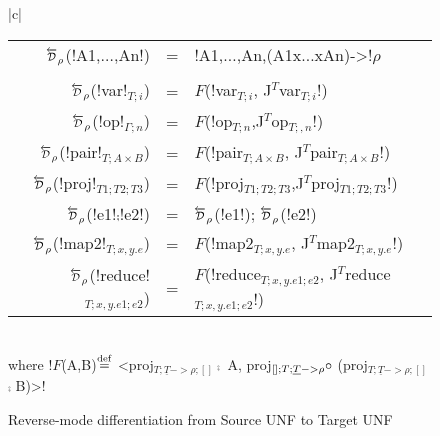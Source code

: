 \begin{figure*}[t]
\begin{tabular}{|c|}
\hline
    \begin{tabular}{r c l}
    $\Dsynrevsymbol_{\rho}$(!A1,$\ldots$,An!) &=& !A1,$\ldots$,An,(A1x$\ldots$xAn)->!$\rho$\\ \\
    $\Dsynrevsymbol_{\rho}$(!var!$_{T;i}$) &=& $F$(!var$_{T;i}$, J$^T$var$_{T;i}$!) \\
    $\Dsynrevsymbol_{\rho}$(!op!$_{\Gamma;n}$) &=& $F$(!op$_{T;n}$,J$^T$op$_{T;,n}$!) \\ 
    $\Dsynrevsymbol_{\rho}$(!pair!$_{T;A\times B}$) &=& $F$(!pair$_{T;A\times B}$, J$^T$pair$_{T;A\times B}$!) \\
    $\Dsynrevsymbol_{\rho}$(!proj!$_{T1;T2;T3}$) &=& $F$(!proj$_{T1;T2;T3}$,J$^T$proj$_{T1;T2;T3}$!) \\
    $\Dsynrevsymbol_{\rho}$(!e1!$\comp$!e2!) &=& $\Dsynrevsymbol_{\rho}$(!e1!); $\Dsynrevsymbol_{\rho}$(!e2!)\\ 
    $\Dsynrevsymbol_{\rho}$(!map2!$_{T;x,y.e}$) &=& $F$(!map2$_{T;x,y.e}$, J$^T$map2$_{T;x,y.e}$!) \\
    $\Dsynrevsymbol_{\rho}$(!reduce!$_{T;x,y.e1;e2}$) &=& $F$(!reduce$_{T;x,y.e1;e2}$, J$^T$reduce$_{T;x,y.e1;e2}$!) \\
    \end{tabular}\\
    where !$F$(A,B)$\stackrel {\mathrm{def}}=$ <proj$_{T;\underline{T}->\rho;[]} \comp$ A, proj$_{[];T;\underline{T}->\rho} \circ$ (proj$_{T;\underline{T}->\rho;[]}$ $\comp$ B)>!\\\hline
    \end{tabular}
    \caption{Reverse-mode differentiation from Source UNF to Target UNF}
    \label{fig:diff_macro}    
\end{figure*}